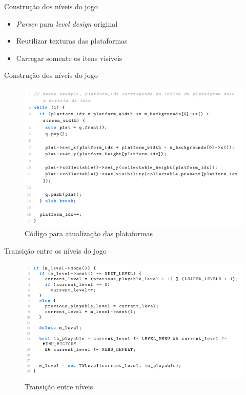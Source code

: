 \documentclass[notes, mathserif]{beamer}
\begin{document}
\begin{frame}{Constru\c c\~ao dos n\'iveis do jogo}
	\begin{itemize}[<+->]
		\item \textit{Parser} para \textit{level design} original
		\item Reutilizar texturas das plataformas
		\item Carregar somente os itens vis\'iveis
	\end{itemize}
\end{frame}

\begin{frame}{Constru\c c\~ao dos n\'iveis do jogo}
	\begin{figure}[H]
		\includegraphics[width=.7\linewidth]{figuras/plats.png}
		\centering
		\caption{C\'odigo para atualiza\c c\~ao das plataformas}
		\label{fig:vsync}
	\end{figure}
\end{frame}

\begin{frame}{Transi\c c\~ao entre os n\'iveis do jogo}
	\begin{figure}[H]
		\includegraphics[width=.8\linewidth]{figuras/transicao.png}
		\centering
		\caption{Transi\c c\~ao entre n\'iveis}
		\label{fig:vsync}
	\end{figure}
\end{frame}
\end{document}
